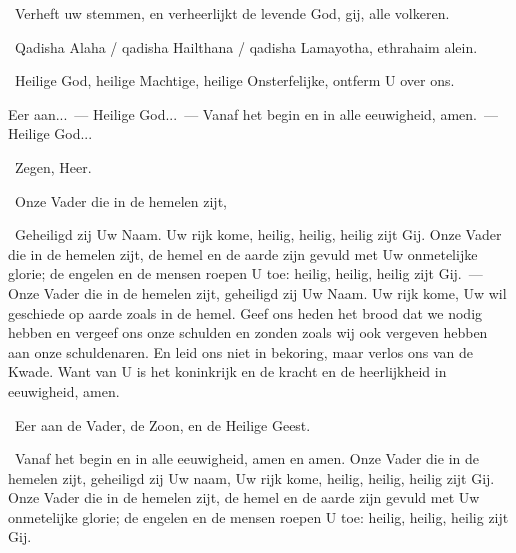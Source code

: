 \documentclass[12pt,twoside,a5paper]{article}
\begin{document}
\dd~Verheft uw stemmen, en verheerlijkt de levende God, gij, alle volkeren.

\begin{doublecols}
  \fontsize{11}{12}\selectfont

  \dutchl \rr~Qadisha Alaha / qadisha Hailthana / qadisha Lamayotha, ethrahaim alein.

   \rr~Heilige God, heilige Machtige, heilige Onsterfelijke, ontferm U over ons.
\end{doublecols}

\begin{halfparskip}
  Eer aan...~--- Heilige God...~--- Vanaf het begin en in alle eeuwigheid, amen.~--- Heilige God...

  \dd~Zegen, Heer.

  \cc~Onze Vader die in de hemelen zijt,

  \rr~Geheiligd zij Uw Naam. Uw rijk kome, heilig, heilig, heilig zijt Gij. Onze Vader die in de hemelen zijt, de hemel en de aarde zijn gevuld met Uw onmetelijke glorie; de engelen en de mensen roepen U toe: heilig, heilig, heilig zijt Gij.~--- Onze Vader die in de hemelen zijt, geheiligd zij Uw Naam. Uw rijk kome, Uw wil geschiede op aarde zoals in de hemel. Geef ons heden het brood dat we nodig hebben en vergeef ons onze schulden en zonden zoals wij ook vergeven hebben aan onze schuldenaren. En leid ons niet in bekoring, maar verlos ons van de Kwade. Want van U is het koninkrijk en de kracht en de heerlijkheid in eeuwigheid, amen.

  \cc~Eer aan de Vader, de Zoon, en de Heilige Geest.

  \rr~Vanaf het begin en in alle eeuwigheid, amen en amen. Onze Vader die in de hemelen zijt, geheiligd zij Uw naam, Uw rijk kome, heilig, heilig, heilig zijt Gij. Onze Vader die in de hemelen zijt, de hemel en de aarde zijn gevuld met Uw onmetelijke glorie; de engelen en de mensen roepen U toe: heilig, heilig, heilig zijt Gij.

\end{halfparskip}
\end{document}
